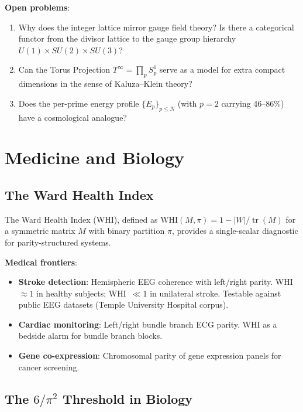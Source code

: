 \documentclass[11pt,a4paper]{article}
\begin{document}
\textbf{Open problems}:
\begin{enumerate}
  \item Why does the integer lattice mirror gauge field theory?
    Is there a categorical functor from the divisor lattice to
    the gauge group hierarchy $U(1) \times SU(2) \times SU(3)$?
  \item Can the Torus Projection $T^\infty = \prod_p S^1_p$ serve
    as a model for extra compact dimensions in the sense of
    Kaluza--Klein theory?
  \item Does the per-prime energy profile $\{E_p\}_{p \leq N}$
    (with $p = 2$ carrying 46--86\%) have a cosmological analogue?
\end{enumerate}

\section{Medicine and Biology}

\subsection{The Ward Health Index}

The Ward Health Index (WHI), defined as
$\text{WHI}(M, \pi) = 1 - |W|/\operatorname{tr}(M)$
for a symmetric matrix $M$ with binary partition $\pi$, provides
a single-scalar diagnostic for parity-structured systems.

\textbf{Medical frontiers}:
\begin{itemize}
  \item \textbf{Stroke detection}: Hemispheric EEG coherence with
    left/right parity. WHI~$\approx 1$ in healthy subjects; WHI~$\ll 1$
    in unilateral stroke. Testable against public EEG datasets
    (Temple University Hospital corpus).
  \item \textbf{Cardiac monitoring}: Left/right bundle branch ECG
    parity. WHI as a bedside alarm for bundle branch blocks.
  \item \textbf{Gene co-expression}: Chromosomal parity of gene
    expression panels for cancer screening.
\end{itemize}

\subsection{The $6/\pi^2$ Threshold in Biology}
\end{document}
